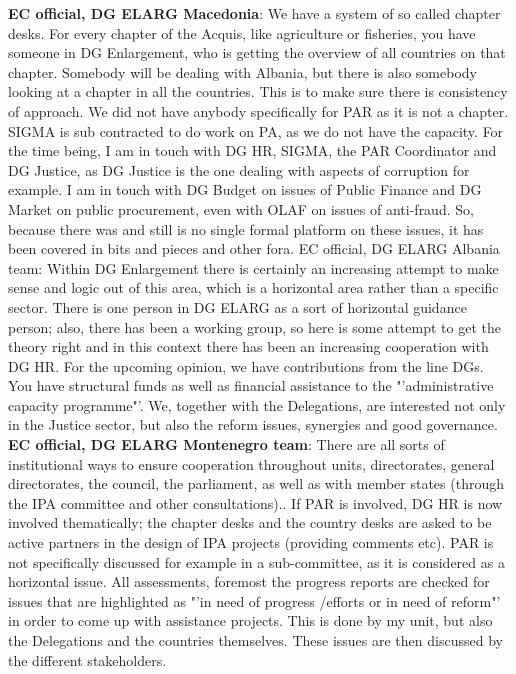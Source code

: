 \textbf{EC official, DG ELARG Macedonia}: We have a system of so called chapter desks. For every chapter of the Acquis, like agriculture or fisheries, you have someone in DG Enlargement, who is getting the overview of all countries on that chapter. Somebody will be dealing with Albania, but there is also somebody looking at a chapter in all the countries. This is to make sure there is consistency of approach. We did not have anybody specifically for PAR as it is not a chapter. SIGMA is sub contracted to do work on PA, as we do not have the capacity. For the time being, I am in touch with DG HR, SIGMA, the PAR Coordinator and DG Justice, as DG Justice is the one dealing with aspects of corruption for example. I am in touch with DG Budget on issues of Public Finance and DG Market on public procurement, even with OLAF on issues of anti-fraud. So, because there was and still is no single formal platform on these issues, it has been covered in bits and pieces and other fora. 
EC official, DG ELARG Albania team: Within DG Enlargement there is certainly an increasing attempt to make sense and logic out of this area, which is a horizontal area rather than a specific sector. There is one person in DG ELARG as a sort of horizontal guidance person; also, there has been a working group, so here is some attempt to get the theory right and in this context there has been an increasing cooperation with DG HR. For the upcoming opinion, we have contributions from the line DGs. You have structural funds as well as financial assistance to the "'administrative capacity programme"'. We, together with the Delegations, are interested not only in the Justice sector, but also the reform issues, synergies and good governance.\\
\textbf{EC official, DG ELARG Montenegro team}: There are all sorts of institutional ways to ensure cooperation throughout units, directorates, general directorates, the council, the parliament, as well as with member states (through the IPA committee and other consultations).. If PAR is involved, DG HR is now involved thematically; the chapter desks and the country desks are asked to be active partners in the design of IPA projects (providing comments etc). PAR is not specifically discussed for example in a sub-committee, as it is considered as a horizontal issue.  All assessments, foremost the progress reports are checked for issues that are highlighted as "'in need of progress /efforts or in need of reform"' in order to come up with assistance projects. This is done by my unit, but also the Delegations and the countries themselves. These issues are then discussed by the different stakeholders.\\
